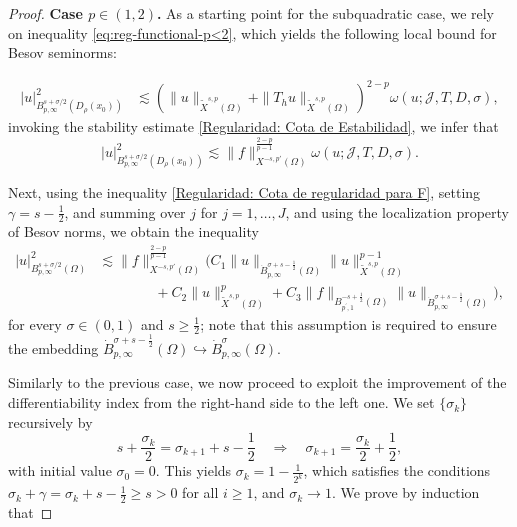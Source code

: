 \documentclass[]{amsart}
\theoremstyle{definition}
\theoremstyle{definition}
\theoremstyle{remark}
\numberwithin{equation}{section}
\begin{document}
\begin{proof}
		
		\textbf{Case \( p \in (1,2) \).} As a starting point for the subquadratic case, we rely on inequality \eqref{eq:reg-functional-p<2}, which yields the following local bound for Besov seminorms:
		
		\[
		\begin{aligned}
			|u|_{B_{p,\infty}^{s+\sigma/2}(D_\rho(x_0))}^{2} &\lesssim (\|u\|_{\widetilde{X}^{s,p}(\Omega)} + \|T_h u\|_{\widetilde{X}^{s,p}(\Omega)})^{2-p} \omega(u; \mathcal{J}, T, D, \sigma),
		\end{aligned}
		\]
	 invoking the stability estimate \eqref{Regularidad: Cota de Estabilidad}, we infer that
		\[
		|u|_{B_{p,\infty}^{s+\sigma/2}(D_\rho(x_0))}^{2} \lesssim \|f\|_{X^{-s,p'}(\Omega)}^{\frac{2-p}{p-1}} \omega(u; \mathcal{J}, T, D, \sigma).
		\]
		
		Next, using the inequality \eqref{Regularidad: Cota de regularidad para F}, setting \(\gamma=s-\frac{1}{2}\), and summing over \(j\) for \(j=1, \ldots, J\), and using the localization property of Besov norms, we obtain the inequality
		\begin{align*}
			|u|_{B_{p,\infty}^{s+\sigma/2}(\Omega)}^{2} 
			&\lesssim \|f\|_{X^{-s,p'}(\Omega)}^{\frac{2-p}{p-1}} \Bigg(
			C_1 \|u\|_{\dot{B}^{\sigma+s-\frac{1}{2}}_{p,\infty}(\Omega)} 
			\|u\|^{p-1}_{\widetilde{X}^{s,p}(\Omega)} \\
			&\hspace{4em} + C_2 \|u\|^{p}_{\widetilde{X}^{s,p}(\Omega)} 
			+ C_3 \|f\|_{B_{p^{\prime},1}^{-s+\frac{1}{2}}(\Omega)} 
			\|u\|_{\dot{B}_{p,\infty}^{\sigma+s-\frac{1}{2}}(\Omega)} 
			\Bigg),
		\end{align*}
     for every \(\sigma \in (0,1)\) and \(s \geq \tfrac{1}{2}\); note that this assumption is required to ensure the embedding \(\dot{B}_{p,\infty}^{\sigma+s - \frac{1}{2}}(\Omega) \hookrightarrow \dot{B}_{p,\infty}^{\sigma}(\Omega).\)
		
		Similarly to the previous case, we now proceed to exploit the improvement of the differentiability index from the right-hand side to the left one. We set \(\{\sigma_k\}\) recursively by
		\[
		s+\frac{\sigma_{k}}{2}=\sigma_{k+1}+s-\frac{1}{2} \quad \Rightarrow \quad \sigma_{k+1}=\frac{\sigma_{k}}{2}+\frac{1}{2},
		\]
		with initial value \(\sigma_{0}=0\). This yields \( \sigma_{k}=1-\frac{1}{2^{k}} \), which satisfies the conditions \(  \sigma_{k}+\gamma=\sigma_{k}+s-\frac{1}{2} \geq s>0 \) for all \( i \geq 1 \), and \( \sigma_{k} \rightarrow 1\). We prove by induction that
		

\end{proof}
\end{document}
